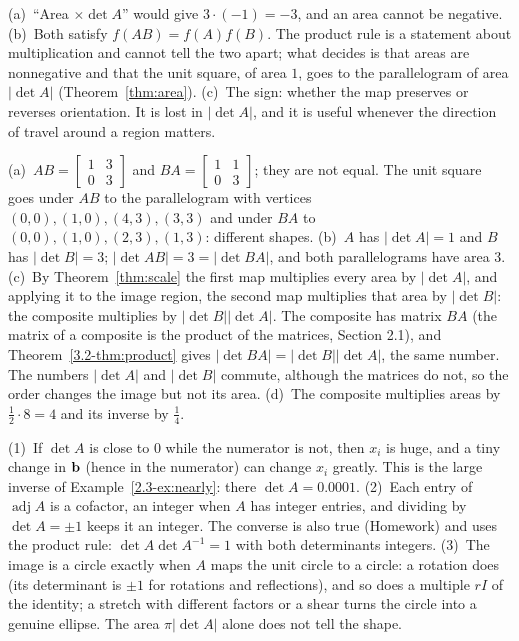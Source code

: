 \documentclass[11pt]{article}
\begin{document}
\begin{description}[leftmargin=0pt,itemsep=5pt]
  \item[Pause and think \ref{think:abs}.] (a)~``Area $\times\det A$'' would give $3\cdot(-1)=-3$, and an area cannot be negative. (b)~Both satisfy $f(AB)=f(A)f(B)$. The product rule is a statement about multiplication and cannot tell the two apart; what decides is that areas are nonnegative and that the unit square, of area $1$, goes to the parallelogram of area $|\det A|$ (Theorem~\ref{thm:area}). (c)~The sign: whether the map preserves or reverses orientation. It is lost in $|\det A|$, and it is useful whenever the direction of travel around a region matters.
  \item[Pause and think \ref{think:compose}.] (a)~$AB=\begin{bmatrix}1&3\\0&3\end{bmatrix}$ and $BA=\begin{bmatrix}1&1\\0&3\end{bmatrix}$; they are not equal. The unit square goes under $AB$ to the parallelogram with vertices $(0,0),(1,0),(4,3),(3,3)$ and under $BA$ to $(0,0),(1,0),(2,3),(1,3)$: different shapes. (b)~$A$ has $|\det A|=1$ and $B$ has $|\det B|=3$; $|\det AB|=3=|\det BA|$, and both parallelograms have area $3$. (c)~By Theorem~\ref{thm:scale} the first map multiplies every area by $|\det A|$, and applying it to the image region, the second map multiplies that area by $|\det B|$: the composite multiplies by $|\det B||\det A|$. The composite has matrix $BA$ (the matrix of a composite is the product of the matrices, Section 2.1), and Theorem~\ref{3.2-thm:product} gives $|\det BA|=|\det B||\det A|$, the same number. The numbers $|\det A|$ and $|\det B|$ commute, although the matrices do not, so the order changes the image but not its area. (d)~The composite multiplies areas by $\tfrac12\cdot8=4$ and its inverse by $\tfrac14$.
  \item[Before the next section.] (1)~If $\det A$ is close to $0$ while the numerator is not, then $x_i$ is huge, and a tiny change in $\mathbf{b}$ (hence in the numerator) can change $x_i$ greatly. This is the large inverse of Example~\ref{2.3-ex:nearly}: there $\det A=0.0001$. (2)~Each entry of $\operatorname{adj}A$ is a cofactor, an integer when $A$ has integer entries, and dividing by $\det A=\pm1$ keeps it an integer. The converse is also true (Homework) and uses the product rule: $\det A\det A^{-1}=1$ with both determinants integers. (3)~The image is a circle exactly when $A$ maps the unit circle to a circle: a rotation does (its determinant is $\pm1$ for rotations and reflections), and so does a multiple $rI$ of the identity; a stretch with different factors or a shear turns the circle into a genuine ellipse. The area $\pi|\det A|$ alone does not tell the shape.
\end{description}
\end{document}
